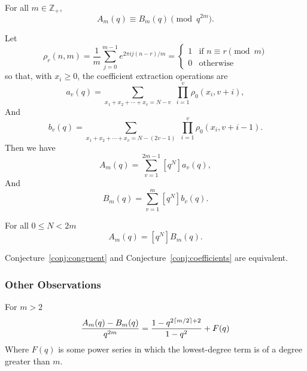 \begin{conjecture}\label{conj:congruent}
    For all $m\in\mathbb{Z}_+$,
    \begin{equation}\label{eq:congruent}
        A_m(q)\equiv B_m(q) \pmod{q^{2m}}.
    \end{equation}
\end{conjecture}
Let
\begin{equation}
    \rho_r(n,m)
    =
    \frac{1}{m}\sum_{j=0}^{m-1}e^{ 2\pi i j(n-r)/m}
    =
    \begin{cases}
        1 &\text{if } n\equiv r \pmod{m}\\
        0 &\text{otherwise}
    \end{cases}
\end{equation}
so that, with $x_i\ge 0$, the coefficient extraction operations are
\begin{equation}
    [q^N]a_v(q)
    =
    \sum_{x_1+x_2+\cdots+x_v=N-v}
    \,\,
    \prod_{i=1}^{v} \rho_0(x_i,v+i)
    ,
\end{equation}
And
\begin{equation}
    [q^N]b_v(q)
    =
    \sum_{x_1+x_2+\cdots+x_v=N-(2v-1)}
    \,\,
    \prod_{i=1}^{v} \rho_0(x_i,v+i-1)
    .
\end{equation}
Then we have
\begin{equation}
    [q^N]A_m(q)
    =
    \sum_{v=1}^{2m-1} [q^N]a_v(q)
    ,
\end{equation}
And
\begin{equation}
    [q^N]B_m(q)
    =
    \sum_{v=1}^{m} [q^N]b_v(q)
    .
\end{equation}

\begin{conjecture}\label{conj:coefficients}
    For all $0\le N<2m$
    \begin{equation}
        [q^N]A_m(q) = [q^N]B_m(q).
    \end{equation}
\end{conjecture}
Conjecture~\autoref{conj:congruent} and Conjecture~\autoref{conj:coefficients} are equivalent.

\subsubsection*{Other Observations}

For $m>2$
\begin{equation}
    \frac{A_m(q)-B_m(q)}{q^{2m}}
    =
    \frac{1-q^{2\lceil m/2\rceil+2}}{1-q^2}+F(q)
\end{equation}
Where $F(q)$ is some power series in which the lowest-degree term is of a degree greater than $m$.

